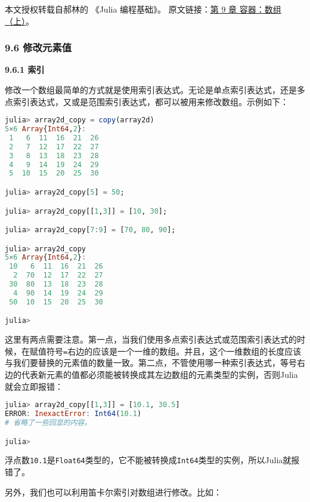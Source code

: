 
本文授权转载自郝林的 《Julia 编程基础》。 原文链接：\href{https://github.com/hyper0x/JuliaBasics/blob/master/book/ch09.md}{第 9 章 容器：数组（上）}。


\subsubsection{9.6 修改元素值}

\textbf{9.6.1 索引}

修改一个数组最简单的方式就是使用索引表达式。无论是单点索引表达式，还是多点索引表达式，又或是范围索引表达式，都可以被用来修改数组。示例如下：

\begin{lstlisting}[language=julia]
julia> array2d_copy = copy(array2d)
5×6 Array{Int64,2}:
 1   6  11  16  21  26
 2   7  12  17  22  27
 3   8  13  18  23  28
 4   9  14  19  24  29
 5  10  15  20  25  30

julia> array2d_copy[5] = 50;

julia> array2d_copy[[1,3]] = [10, 30];

julia> array2d_copy[7:9] = [70, 80, 90];

julia> array2d_copy
5×6 Array{Int64,2}:
 10   6  11  16  21  26
  2  70  12  17  22  27
 30  80  13  18  23  28
  4  90  14  19  24  29
 50  10  15  20  25  30

julia> 
\end{lstlisting}

这里有两点需要注意。第一点，当我们使用多点索引表达式或范围索引表达式的时候，在赋值符号\verb`=`右边的应该是一个一维的数组。并且，这个一维数组的长度应该与我们要替换的元素值的数量一致。第二点，不管使用哪一种索引表达式，等号右边的代表新元素的值都必须能被转换成其左边数组的元素类型的实例，否则Julia就会立即报错：

\begin{lstlisting}[language=julia]
julia> array2d_copy[[1,3]] = [10.1, 30.5]
ERROR: InexactError: Int64(10.1)
# 省略了一些回显的内容。

julia> 
\end{lstlisting}

浮点数\verb`10.1`是\verb`Float64`类型的，它不能被转换成\verb`Int64`类型的实例，所以Julia就报错了。

另外，我们也可以利用笛卡尔索引对数组进行修改。比如：

